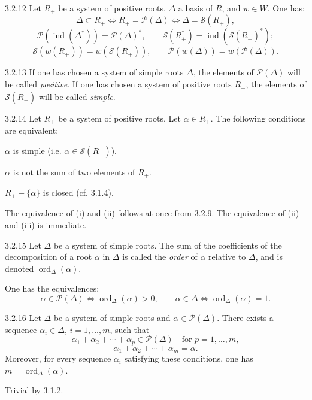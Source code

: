 \begin{corollary}{3.2.12}\label{XXI.3.2.12}
Let $R_+$ be a system of positive roots, $\Delta$ a basis of $R$, and $w\in W$. One has:
\[
\Delta\subset R_+\Longleftrightarrow R_+=\mathcal P(\Delta)\Longleftrightarrow\Delta=\mathcal S(R_+),
\]
\[
\mathcal P(\operatorname{ind}(\Delta^*))=\mathcal P(\Delta)^*,\qquad
\mathcal S(R_+^*)=\operatorname{ind}(\mathcal S(R_+)^*);
\]
\[
\mathcal S(w(R_+))=w(\mathcal S(R_+)),\qquad\mathcal P(w(\Delta))=w(\mathcal P(\Delta)).
\]
\end{corollary}
\begin{definition}{3.2.13}\label{XXI.3.2.13}
If one has chosen a system of simple roots $\Delta$, the elements of $\mathcal P(\Delta)$ will be called \emph{positive}. If one has chosen a system of positive roots $R_+$, the elements of $\mathcal S(R_+)$ will be called \emph{simple}.
\end{definition}
\begin{corollary}{3.2.14}\label{XXI.3.2.14}
Let $R_+$ be a system of positive roots. Let $\alpha\in R_+$. The following conditions are equivalent:
\begin{enumeratei}
\item $\alpha$ is simple (i.e. $\alpha\in\mathcal S(R_+)$).
\item $\alpha$ is not the sum of two elements of $R_+$.
\item $R_+-\{\alpha\}$ is closed (cf. 3.1.4).
\end{enumeratei}
\end{corollary}
The equivalence of (i) and (ii) follows at once from 3.2.9. The equivalence of (ii) and (iii) is immediate.
\begin{definition}{3.2.15}\label{XXI.3.2.15}
Let $\Delta$ be a system of simple roots. The sum of the coefficients of the decomposition of a root $\alpha$ in $\Delta$ is called the \emph{order} of $\alpha$ relative to $\Delta$, and is denoted $\operatorname{ord}_\Delta(\alpha)$.
\end{definition}
One has the equivalences:
\[
\alpha\in\mathcal P(\Delta)\Longleftrightarrow\operatorname{ord}_\Delta(\alpha)>0,\qquad
\alpha\in\Delta\Longleftrightarrow\operatorname{ord}_\Delta(\alpha)=1.
\]
\begin{lemma}{3.2.16}\label{XXI.3.2.16}
Let $\Delta$ be a system of simple roots and $\alpha\in\mathcal P(\Delta)$. There exists a sequence $\alpha_i\in\Delta$, $i=1,\ldots,m$, such that
\[
\alpha_1+\alpha_2+\cdots+\alpha_p\in\mathcal P(\Delta)\quad\text{for }p=1,\ldots,m,
\]
\[
\alpha_1+\alpha_2+\cdots+\alpha_m=\alpha.
\]
Moreover, for every sequence $\alpha_i$ satisfying these conditions, one has $m=\operatorname{ord}_\Delta(\alpha)$.
\end{lemma}
Trivial by 3.1.2.

